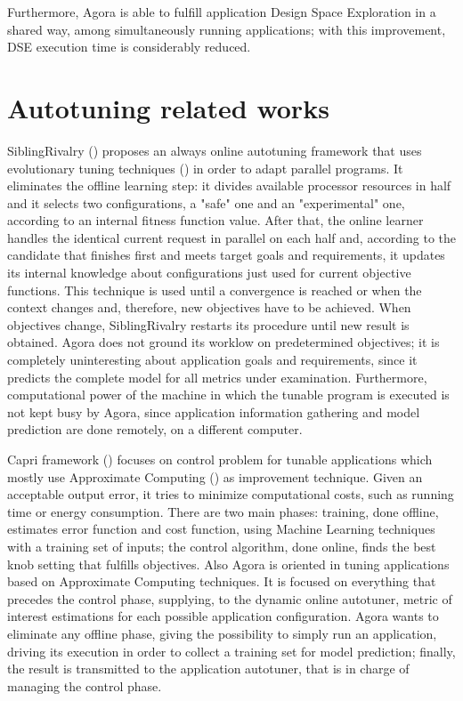 Furthermore, Agora is able to fulfill application Design Space Exploration in a shared way, among simultaneously running applications; with this improvement, DSE execution time is considerably reduced. 

\section{Autotuning related works}

SiblingRivalry (\cite{ansel2012siblingrivalry}) proposes an always online autotuning framework that uses evolutionary tuning techniques (\cite{coello2007evolutionary}) in order to adapt parallel programs. It eliminates the offline learning step: it divides available processor resources in half and it selects two configurations, a "safe" one and an "experimental" one, according to an internal fitness function value. After that, the online learner handles the identical current request in parallel on each half and, according to the candidate that finishes first and meets target goals and requirements, it updates its internal knowledge about configurations just used for current objective functions. This technique is used until a convergence is reached or when the context changes and, therefore, new objectives have to be achieved. When objectives change, SiblingRivalry restarts its procedure until new result is obtained. Agora does not ground its worklow on predetermined objectives; it is completely uninteresting about application goals and requirements, since it predicts the complete model for all metrics under examination. Furthermore, computational power of the machine in which the tunable program is executed is not kept busy by Agora, since application information gathering and model prediction are done remotely, on a different computer.

Capri framework (\cite{sui2016proactive}) focuses on control problem for tunable applications which mostly use Approximate Computing (\cite{mittal2016survey}) as improvement technique. Given an acceptable output error, it tries to minimize computational costs, such as running time or energy consumption. There are two main phases: training, done offline, estimates error function and cost function, using Machine Learning techniques with a training set of inputs; the control algorithm, done online, finds the best knob setting that fulfills objectives. Also Agora is oriented in tuning applications based on Approximate Computing techniques. It is focused on everything that precedes the control phase, supplying, to the dynamic online autotuner, metric of interest estimations for each possible application configuration. Agora wants to eliminate any offline phase, giving the possibility to simply run an application, driving its execution in order to collect a training set for model prediction; finally, the result is transmitted to the application autotuner, that is in charge of managing the control phase.

